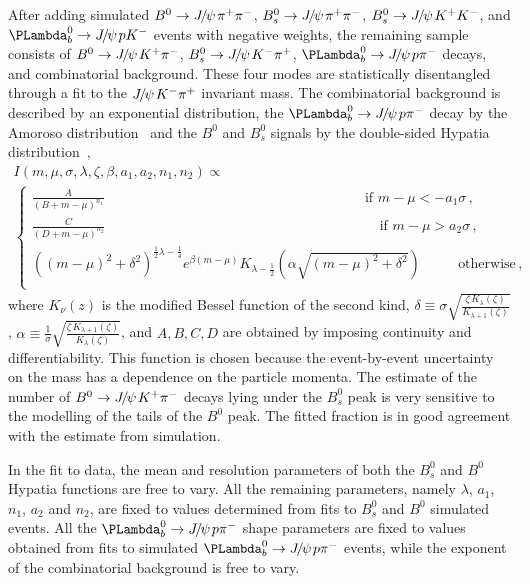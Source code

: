 \documentclass[12pt,a4paper]{article}
\def\PJ      {\ensuremath{J}\xspace}
\def\Ppsi {\ensuremath{\psi}\xspace}
\def\jpsi     {{\ensuremath{{\PJ\mskip -3mu/\mskip -2mu\Ppsi\mskip 2mu}}}\xspace}
\def\Jpsi     {{\ensuremath{\jpsi}}\xspace}
\newcommand{\Bs}{\ensuremath{B^0_s}\xspace}
\newcommand{\Bd}{\ensuremath{B^0}\xspace}
\newcommand{\Lambdab}{\ensuremath{\PLambda^0_b}\xspace}
\newcommand{\BdJpsiKpi}{\ensuremath{B^0\to \jpsi \Kp \pim}\xspace}
\newcommand{\BsJpsiKpi}{\ensuremath{B^0_s\to \jpsi \Km \pip}\xspace}
\newcommand{\BdJpsipipi}{\ensuremath{B^0\to \jpsi \pi^+\pi^-}\xspace}
\newcommand{\BsJpsipipi}{\ensuremath{B^0_s\to \jpsi \pi^+\pi^-}\xspace}
\newcommand{\BsJpsiKK}{\ensuremath{B^0_s\to \jpsi K^+K^-}\xspace}
\newcommand{\LbJpsipK}{\ensuremath{\Lambdab\to\Jpsi p K^-}\xspace}
\newcommand{\LbJpsippi}{\ensuremath{\Lambdab\to\Jpsi p \pi^-}\xspace}
\newcommand{\Km}{\ensuremath{K^-}\xspace}
\newcommand{\Kp}{\ensuremath{K^+}\xspace}
\newcommand{\pim}{\ensuremath{\pi^-}\xspace}
\newcommand{\pip}{\ensuremath{\pi^+}\xspace}
\begin{document}
After adding simulated \BdJpsipipi, \BsJpsipipi, \BsJpsiKK, and \mbox{\LbJpsipK} events with negative weights, the remaining sample consists of \mbox{\BdJpsiKpi}, \BsJpsiKpi, \LbJpsippi decays, and combinatorial background.
These four modes are statistically disentangled through a fit to the $\jpsi \Km\pip$ invariant mass. The combinatorial background is described by an exponential distribution, the \LbJpsippi decay by the Amoroso distribution~\cite{Amoroso} and the \Bd and \Bs signals by the double-sided Hypatia distribution~\cite{Santos:2013gra},
\begin{multline}
I(m,\mu,\sigma,\lambda,\zeta,\beta,a_1,a_2,n_1,n_2) \propto\\
\begin{cases}
\frac {A}{\left(B + m-\mu \right)^{n_1}}\phantom{,,,,,,,,,,,,,,,,,,,,,,,,,,,,,,,,,,,,,,,,-}\text{if } m - \mu < -a_1\sigma\,,\\
\frac {C}{\left(D + m-\mu \right)^{n_2}}\phantom{,,,,,,,,,,,,,,,,,,,,,,,,,,,,,,,,,,,,,,,,,,,,}\text{if } m - \mu > a_2\sigma\,,\\
\left((m-\mu)^{2} + \delta^{2}\right)^{\frac{1}{2} \lambda - \frac{1}{4}} e^{\beta (m-\mu)} K_{\lambda - \frac{1}{2}}\left(\alpha \sqrt{(m-\mu)^{2} + \delta^{2}}\right)\phantom{,,,,,,}\text{otherwise}\,,\phantom{,,}\\
\end{cases}
\end{multline}
where $K_{\nu}(z)$ is the modified Bessel function of the second kind, $\delta\equiv\sigma\sqrt{\frac{\zeta\,
K_\lambda(\zeta)}{K_{\lambda+1}(\zeta)}}$, \mbox{$\alpha\equiv\frac{1}{\sigma}\sqrt{\frac{\zeta\, K_{\lambda+1}(\zeta)}{K_\lambda(\zeta)}}$}, and
$A,B,C,D$ are obtained by imposing continuity and differentiability. This function is chosen because the
event-by-event uncertainty on the mass has a dependence on the particle momenta. 
The estimate of the number of \BdJpsiKpi decays lying under the \Bs peak is very sensitive to the modelling of the tails of the \Bd peak.
The fitted fraction is in good agreement with the estimate from simulation.

In the fit to data, the mean and resolution parameters of both the \Bs and \Bd Hypatia functions are free to vary. All the remaining parameters, namely $\lambda$, $a_1$, $n_1$, $a_2$ and $n_2$, are fixed to values determined from fits to \Bs and \Bd simulated events.
All the \LbJpsippi shape parameters are fixed to values obtained from fits to simulated \LbJpsippi events, while the exponent of the combinatorial background is free to vary. 
\end{document}
